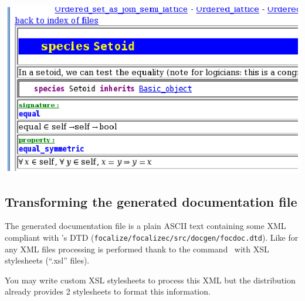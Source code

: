 \medskip
\includegraphics{mathml_snapshot.ps}



\subsection{Transforming the generated documentation file}
The generated documentation file is a plain ASCII text containing some
XML compliant with \focal's DTD
({\tt focalize/focalizec/src/docgen/focdoc.dtd}). Like for any XML
files processing is performed thank to the command \xsltproc\ with 
XSL stylesheets (``.xsl'' files).

You may write custom XSL stylesheets to process this XML but the
distribution already provides 2 stylesheets to format this
information.



